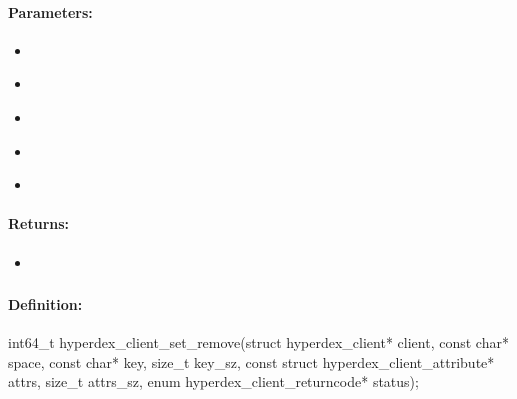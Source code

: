 \paragraph{Parameters:}
\begin{itemize}[noitemsep]
\item {}\\

\item {}\\

\item {}\\

\item {}\\

\item {}\\

\end{itemize}

\paragraph{Returns:}
\begin{itemize}[noitemsep]
\item {}\\

\end{itemize}

\pagebreak
\subsubsection{}
\label{api:c:set_remove}


\paragraph{Definition:}
\begin{ccode}
int64_t hyperdex_client_set_remove(struct hyperdex_client* client,
        const char* space,
        const char* key, size_t key_sz,
        const struct hyperdex_client_attribute* attrs, size_t attrs_sz,
        enum hyperdex_client_returncode* status);
\end{ccode}

